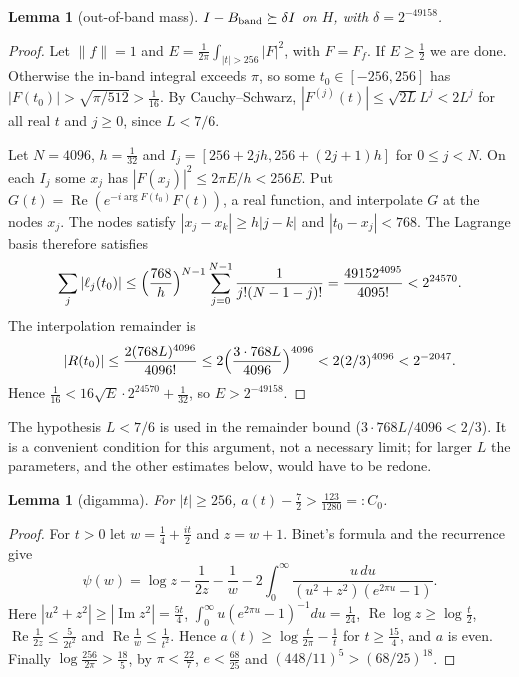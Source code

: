 \documentclass[11pt]{amsart}
\newtheorem{lemma}[proposition]{Lemma}
\theoremstyle{remark}
\numberwithin{equation}{section}
\begin{document}
\begin{lemma}[out-of-band mass]\label{lem:delta}
$I-B_{\rm band}\succeq\delta I$ on $H$, with $\delta=2^{-49158}$.
\end{lemma}
\begin{proof}
Let $\|f\|=1$ and $E=\frac1{2\pi}\int_{|t|>256}|F|^2$, with $F=F_f$. If $E\ge\frac12$ we are done. Otherwise the in-band integral exceeds $\pi$, so some $t_0\in[-256,256]$ has $|F(t_0)|>\sqrt{\pi/512}>\frac1{16}$. By Cauchy--Schwarz, $|F^{(j)}(t)|\le\sqrt{2L}L^j<2L^j$ for all real $t$ and $j\ge0$, since $L<7/6$.

Let $N=4096$, $h=\frac1{32}$ and $I_j=[256+2jh,256+(2j+1)h]$ for $0\le j<N$. On each $I_j$ some $x_j$ has $|F(x_j)|^2\le2\pi E/h<256E$. Put $G(t)=\operatorname{Re}(e^{-i\arg F(t_0)}F(t))$, a real function, and interpolate $G$ at the nodes $x_j$. The nodes satisfy $|x_j-x_k|\ge h|j-k|$ and $|t_0-x_j|<768$. The Lagrange basis therefore satisfies
\[
\sum_j|\ell_j(t_0)|\le\Bigl(\frac{768}h\Bigr)^{N-1}\sum_{j=0}^{N-1}\frac1{j!(N-1-j)!}=\frac{49152^{4095}}{4095!}<2^{24570}.
\]
The interpolation remainder is
\[
|R(t_0)|\le\frac{2(768L)^{4096}}{4096!}\le2\Bigl(\frac{3\cdot768L}{4096}\Bigr)^{4096}<2(2/3)^{4096}<2^{-2047}.
\]
Hence $\frac1{16}<16\sqrt E\cdot2^{24570}+\frac1{32}$, so $E>2^{-49158}$.
\end{proof}

The hypothesis $L<7/6$ is used in the remainder bound ($3\cdot768L/4096<2/3$). It is a convenient condition for this argument, not a necessary limit; for larger $L$ the parameters, and the other estimates below, would have to be redone.

\begin{lemma}[digamma]\label{lem:digamma}
For $|t|\ge256$, $a(t)-\frac72>\frac{123}{1280}=:C_0$.
\end{lemma}
\begin{proof}
For $t>0$ let $w=\frac14+\frac{it}2$ and $z=w+1$. Binet's formula \cite[5.9.15]{DLMF} and the recurrence \cite[5.5.2]{DLMF} give
\[
\psi(w)=\log z-\frac1{2z}-\frac1w-2\int_0^\infty\frac{u\,du}{(u^2+z^2)(e^{2\pi u}-1)} .
\]
Here $|u^2+z^2|\ge|\operatorname{Im}z^2|=\frac{5t}4$, $\int_0^\infty u(e^{2\pi u}-1)^{-1}du=\frac1{24}$, $\operatorname{Re}\log z\ge\log\frac t2$, $\operatorname{Re}\frac1{2z}\le\frac5{2t^2}$ and $\operatorname{Re}\frac1w\le\frac1{t^2}$. Hence $a(t)\ge\log\frac t{2\pi}-\frac1t$ for $t\ge\frac{15}4$, and $a$ is even. Finally $\log\frac{256}{2\pi}>\frac{18}5$, by $\pi<\frac{22}7$, $e<\frac{68}{25}$ and $(448/11)^5>(68/25)^{18}$.
\end{proof}
\end{document}
